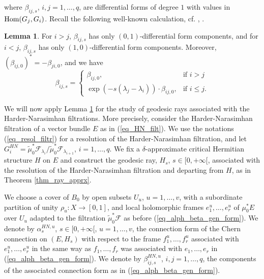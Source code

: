 \documentclass[12pt]{article}
\numberwithin{equation}{section}
\theoremstyle{theorem}
\theoremstyle{definition}
\newtheorem{lem}[thm]{Lemma}
\theoremstyle{remark}
\begin{document}
	where $\beta_{ij, s}$, $i, j = 1, \ldots, q$, are differential forms of degree $1$ with values in ${\rm{Hom}}(G_j, G_i)$. 
	Recall the following well-known calculation, cf. \cite[Propositions 1.6.4 - 1.6.6]{KobaVB}, \cite[Lemmas 3.1, 3.2]{JonsMcClShiva}.
	\begin{lem}\label{prop_beta_form}
		For $i > j$, $\beta_{ij, s}$ has only $(0, 1)$-differential form components, and for $i < j$, $\beta_{ij, s}$ has only $(1, 0)$-differential form components.
		Moreover, $(\beta_{ij, 0})^* = - \beta_{ji, 0}$, and we have
		\begin{equation}
			\beta_{ij, s}=
			\begin{cases}
				\beta_{ij, 0}, & \text{if } i > j \\
				\exp(-s (\lambda_j - \lambda_i)) \cdot \beta_{ij, 0}, & \text{if } i \leq j.
			\end{cases}
		\end{equation}
	\end{lem}
	We will now apply Lemma \ref{prop_beta_form} for the study of geodesic rays associated with the Harder-Narasimhan filtrations.
	More precisely, consider the Harder-Narasimhan filtration of a vector bundle $E$ as in (\ref{eq_HN_filt}).
	We use the notations (\ref{eq_resol_filtr}) for a resolution of the Harder-Narasimhan filtration, and let $G_i^{HN} = \tilde{\mu}_0^* \mathcal{F}_{\lambda_i} / \tilde{\mu}_0^* \mathcal{F}_{\lambda_{i + 1}}$, $i = 1, \ldots, q$.
	We fix a $\delta$-approximate critical Hermitian structure $H$ on $E$ and construct the geodesic ray, $H_s$, $s \in [0, +\infty[$, associated with the resolution of the Harder-Narasimhan filtration and departing from $H$, as in Theorem \ref{thm_ray_apprx}.
	\par 
	We choose a cover of $B_0$ by open subsets $U_u$, $u = 1, \ldots, v$, with a subordinate partition of unity $\rho_u : X \to [0, 1]$, and local holomorphic frames $e_1^u, \ldots, e_r^u$ of $\mu_0^* E$ over $U_u$ adapted to the filtration $\tilde{\mu}_0^* \mathcal{F}$ as before (\ref{eq_alph_beta_gen_form}).
	We denote by $\alpha_s^{HN, u}$, $s \in [0, +\infty[$, $u = 1, \ldots, v$, the connection form of the Chern connection on $(E, H_s)$ with respect to the frame $f_1^u, \ldots, f_r^u$ associated with $e_1^u, \ldots, e_r^u$ in the same way as $f_1, \ldots, f_r$ was associated with $e_1, \ldots, e_r$ in (\ref{eq_alph_beta_gen_form}).
	We denote by $\beta_{i j, s}^{HN, u}$, $i, j = 1, \ldots, q$, the components of the associated connection form as in (\ref{eq_alph_beta_gen_form}).
	\par 
\end{document}
